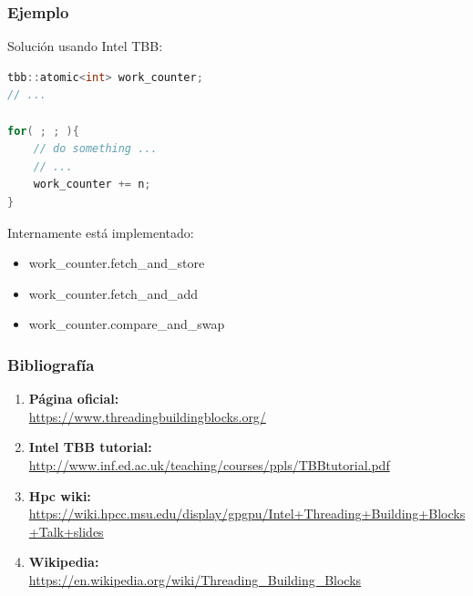 \documentclass[10pt]{beamer}
\begin{document}
\begin{frame}[fragile] %
  \frametitle{Ejemplo}
  \alert{Solución} usando Intel TBB:

  \begin{lstlisting}[language=C++, frame=single]
tbb::atomic<int> work_counter;
// ...

for( ; ; ){
    // do something ...
    // ...
    work_counter += n;
}
  \end{lstlisting}
  Internamente está implementado:
  \begin{itemize}
  \item work\_counter.fetch\_and\_store
  \item work\_counter.fetch\_and\_add
  \item work\_counter.compare\_and\_swap
  \end{itemize}
\end{frame}

\begin{frame}
  \frametitle{Bibliografía}
  
  \begin{enumerate}
  \item \textbf{Página oficial:}\\\url{https://www.threadingbuildingblocks.org/}
  \item \textbf{Intel TBB tutorial:}\\\url{http://www.inf.ed.ac.uk/teaching/courses/ppls/TBBtutorial.pdf}
  \item \textbf{Hpc wiki:}\\\url{https://wiki.hpcc.msu.edu/display/gpgpu/Intel+Threading+Building+Blocks+Talk+slides}
  \item \textbf{Wikipedia:}\\\url{https://en.wikipedia.org/wiki/Threading_Building_Blocks}
  \end{enumerate}
\end{frame}
\end{document}
